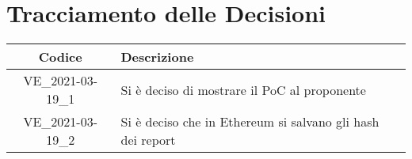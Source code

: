 \section*{Tracciamento delle Decisioni}

\begin{center}
	\begin{longtable}{|c|p{13cm}|}
	\hline
	\rowcolor{lighter-grayer}
	\textbf{Codice} & \textbf{Descrizione} \\
	\hline
	\endfirsthead

	\hline
	VE\_2021-03-19\_1 & Si è deciso di mostrare il PoC al proponente \\
	VE\_2021-03-19\_2 & Si è deciso che in Ethereum si salvano gli hash dei report  \\						
	\hline

	\end{longtable}
\end{center}